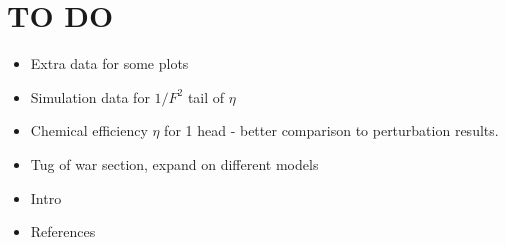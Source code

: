 \documentclass[aps,pre,onecolumn,showpacs,showkeys,a4paper]{revtex4}
\begin{document}
\newpage
\section{TO DO}
\begin{itemize}
\item Extra data for some plots
\item Simulation data for $1/F^2$ tail of $\eta$
\item Chemical efficiency $\eta$ for 1 head - better comparison to perturbation results.
\item Tug of war section, expand on different models
\item Intro
\item References
\end{itemize}



\end{document}
